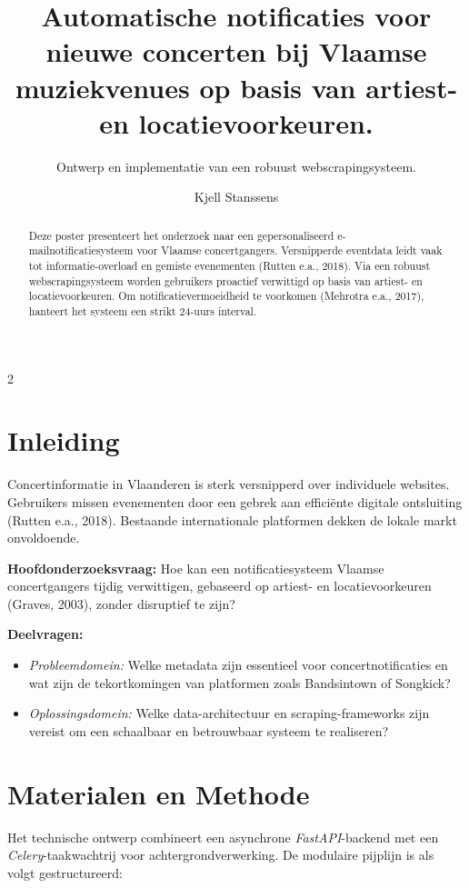 \documentclass[a0,portrait]{hogent-poster}
\title{Automatische notificaties voor nieuwe concerten bij Vlaamse muziekvenues op basis van artiest- en locatievoorkeuren.}
\subtitle{Ontwerp en implementatie van een robuust webscrapingsysteem.}
\author{Kjell Stanssens}
\begin{document}
\maketitle

\large

\begin{abstract}
Deze poster presenteert het onderzoek naar een gepersonaliseerd e-mailnotificatiesysteem voor Vlaamse concertgangers. Versnipperde eventdata leidt vaak tot informatie-overload en gemiste evenementen (Rutten e.a., 2018). Via een robuust webscrapingsysteem worden gebruikers proactief verwittigd op basis van artiest- en locatievoorkeuren. Om notificatievermoeidheid te voorkomen (Mehrotra e.a., 2017), hanteert het systeem een strikt 24-uurs interval.
\end{abstract}

\begin{multicols}{2} 

\section{Inleiding}

Concertinformatie in Vlaanderen is sterk versnipperd over individuele websites. Gebruikers missen evenementen door een gebrek aan efficiënte digitale ontsluiting (Rutten e.a., 2018). Bestaande internationale platformen dekken de lokale markt onvoldoende.

\textbf{Hoofdonderzoeksvraag:} Hoe kan een notificatiesysteem Vlaamse concertgangers tijdig verwittigen, gebaseerd op artiest- en locatievoorkeuren (Graves, 2003), zonder disruptief te zijn?

\textbf{Deelvragen:}
\begin{itemize}
    \item \textit{Probleemdomein:} Welke metadata zijn essentieel voor concertnotificaties en wat zijn de tekortkomingen van platformen zoals Bandsintown of Songkick?
    \item \textit{Oplossingsdomein:} Welke data-architectuur en scraping-frameworks zijn vereist om een schaalbaar en betrouwbaar systeem te realiseren?
\end{itemize}

\section{Materialen en Methode}

Het technische ontwerp combineert een asynchrone \textit{FastAPI}-backend met een \textit{Celery}-taakwachtrij voor achtergrondverwerking. De modulaire pijplijn is als volgt gestructureerd:


\end{multicols}
\end{document}
